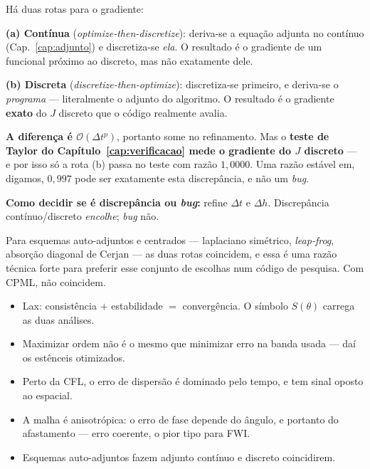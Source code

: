 \documentclass[11pt,a4paper,oneside]{report}
\begin{document}
\begin{teoria}
H\'a duas rotas para o gradiente:

\textbf{(a) Cont\'inua} (\emph{optimize-then-discretize}): deriva-se a
equa\c{c}\~ao adjunta no cont\'inuo (Cap.~\ref{cap:adjunto}) e discretiza-se
\emph{ela}. O resultado \'e o gradiente de um funcional pr\'oximo ao discreto,
mas n\~ao exatamente dele.

\textbf{(b) Discreta} (\emph{discretize-then-optimize}): discretiza-se
primeiro, e deriva-se o \emph{programa} --- literalmente o adjunto do
algoritmo. O resultado \'e o gradiente \textbf{exato} do $J$ discreto que o
c\'odigo realmente avalia.

\textbf{A diferen\c{c}a \'e $\mathcal{O}(\Delta t^{p})$}, portanto some no
refinamento. Mas o \textbf{teste de Taylor do Cap\'itulo~\ref{cap:verificacao}
mede o gradiente do $J$ discreto} --- e por isso s\'o a rota (b) passa no
teste com raz\~ao $1{,}0000$. Uma raz\~ao est\'avel em, digamos, $0{,}997$ pode
ser exatamente esta discrep\^ancia, e n\~ao um \emph{bug}.

\textbf{Como decidir se \'e discrep\^ancia ou \emph{bug}:} refine $\Delta t$ e
$\Delta h$. Discrep\^ancia cont\'inuo/discreto \emph{encolhe}; \emph{bug}
n\~ao.

Para esquemas auto-adjuntos e centrados --- laplaciano sim\'etrico,
\emph{leap-frog}, absor\c{c}\~ao diagonal de Cerjan --- as duas rotas
coincidem, e essa \'e uma raz\~ao t\'ecnica forte para preferir esse conjunto
de escolhas num c\'odigo de pesquisa. Com CPML, n\~ao coincidem.
\end{teoria}

\begin{resumo}
\begin{itemize}[leftmargin=*, itemsep=1pt]
\item Lax: consist\^encia $+$ estabilidade $=$ converg\^encia. O s\'imbolo
$S(\theta)$ carrega as duas an\'alises.
\item Maximizar ordem n\~ao \'e o mesmo que minimizar erro na banda usada ---
da\'i os est\^enceis otimizados.
\item Perto da CFL, o erro de dispers\~ao \'e dominado pelo tempo, e tem sinal
oposto ao espacial.
\item A malha \'e anisotr\'opica: o erro de fase depende do \^angulo, e
portanto do afastamento --- erro coerente, o pior tipo para FWI.
\item Esquemas auto-adjuntos fazem adjunto cont\'inuo e discreto coincidirem.
\end{itemize}
\end{resumo}
\end{document}
